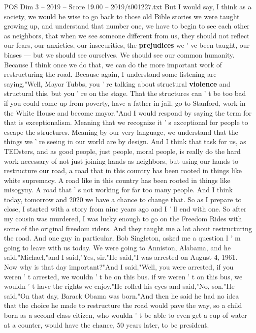 \begin{textsample}{POS Dim 3 – 2019 – Score 19.00 – 2019/t001227.txt}
But I would say, I think as a society, we would be wise to go back to those old Bible stories we were taught growing up, and understand that number one, we have to begin to see each other as neighbors, that when we see someone different from us, they should not reflect our fears, our anxieties, our insecurities, the \textbf{prejudices} we ' ve been taught, our biases — but we should see ourselves.
We should see our common humanity.
Because I think once we do that, we can do the more important work of restructuring the road.
Because again, I understand some listening are saying,"Well, Mayor Tubbs, you ' re talking about structural \textbf{violence} and structural this, but you ' re on the stage.
That the structures can ' t be too bad if you could come up from poverty, have a father in jail, go to Stanford, work in the White House and become mayor."And I would respond by saying the term for that is exceptionalism.
Meaning that we recognize it ' s exceptional for people to escape the structures.
Meaning by our very language, we understand that the things we ' re seeing in our world are by design.
And I think that task for us, as TEDsters, and as good people, just people, moral people, is really do the hard work necessary of not just joining hands as neighbors, but using our hands to restructure our road, a road that in this country has been rooted in things like white supremacy.
A road like in this country has been rooted in things like misogyny.
A road that ' s not working for far too many people.
And I think today, tomorrow and 2020 we have a chance to change that.
So as I prepare to close, I started with a story from nine years ago and I ' ll end with one.
So after my cousin was murdered, I was lucky enough to go on the Freedom Rides with some of the original freedom riders.
And they taught me a lot about restructuring the road.
And one guy in particular, Bob Singleton, asked me a question I ' m going to leave with us today.
We were going to Anniston, Alabama, and he said,"Michael,"and I said,"Yes, sir."He said,"I was arrested on August 4, 1961.
Now why is that day important?"And I said,"Well, you were arrested, if you weren ' t arrested, we wouldn ' t be on this bus. if we weren ' t on this bus, we wouldn ' t have the rights we enjoy."He rolled his eyes and said,"No, son."He said,"On that day, Barack Obama was born."And then he said he had no idea that the choice he made to restructure the road would pave the way, so a child born as a second class citizen, who wouldn ' t be able to even get a cup of water at a counter, would have the chance, 50 years later, to be president.

\end{textsample}
